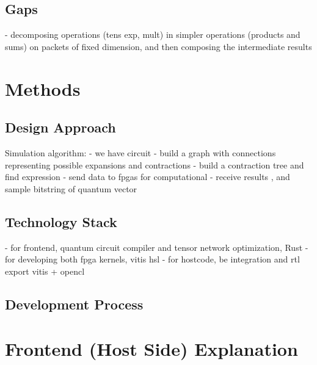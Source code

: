 \documentclass[12pt,oneside,a4paper]{article}
\begin{document}

\subsection{Gaps}
- decomposing operations (tens exp, mult) in simpler operations (products and sums) on packets of fixed dimension, and then composing the intermediate results





\section{Methods}

\subsection{Design Approach}
Simulation algorithm:
- we have circuit
- build a graph with connections representing possible expansions and contractions
- build a contraction tree and find expression
- send data to fpgas for computational
- receive results , and sample bitstring of quantum vector

\subsection{Technology Stack}
- for frontend, quantum circuit compiler and tensor network optimization, Rust
- for developing both fpga kernels, vitis hsl
- for hostcode, be integration and rtl export vitis + opencl

\subsection{Development Process}



\section{Frontend (Host Side) Explanation}
\end{document}

